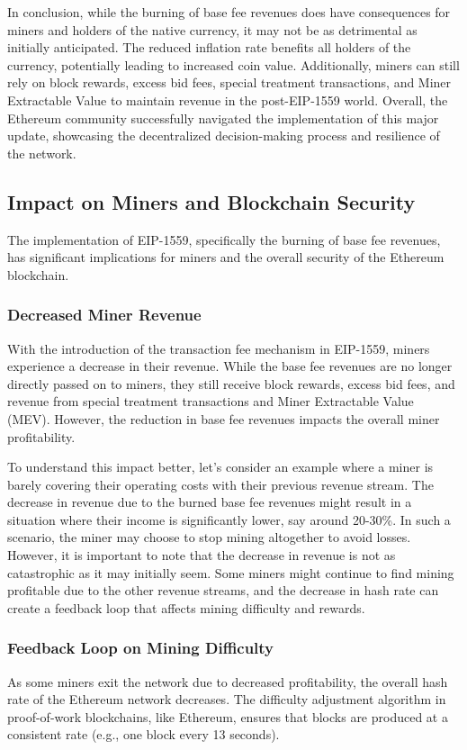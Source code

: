 In conclusion, while the burning of base fee revenues does have consequences for miners and holders of the native currency, it may not be as detrimental as initially anticipated. The reduced inflation rate benefits all holders of the currency, potentially leading to increased coin value. Additionally, miners can still rely on block rewards, excess bid fees, special treatment transactions, and Miner Extractable Value to maintain revenue in the post-EIP-1559 world. Overall, the Ethereum community successfully navigated the implementation of this major update, showcasing the decentralized decision-making process and resilience of the network.

\subsection{Impact on Miners and Blockchain Security}
The implementation of EIP-1559, specifically the burning of base fee revenues, has significant implications for miners and the overall security of the Ethereum blockchain.

\subsubsection{Decreased Miner Revenue}
With the introduction of the transaction fee mechanism in EIP-1559, miners experience a decrease in their revenue. While the base fee revenues are no longer directly passed on to miners, they still receive block rewards, excess bid fees, and revenue from special treatment transactions and Miner Extractable Value (MEV). However, the reduction in base fee revenues impacts the overall miner profitability.

To understand this impact better, let's consider an example where a miner is barely covering their operating costs with their previous revenue stream. The decrease in revenue due to the burned base fee revenues might result in a situation where their income is significantly lower, say around 20-30\%. In such a scenario, the miner may choose to stop mining altogether to avoid losses. However, it is important to note that the decrease in revenue is not as catastrophic as it may initially seem. Some miners might continue to find mining profitable due to the other revenue streams, and the decrease in hash rate can create a feedback loop that affects mining difficulty and rewards.

\subsubsection{Feedback Loop on Mining Difficulty}
As some miners exit the network due to decreased profitability, the overall hash rate of the Ethereum network decreases. The difficulty adjustment algorithm in proof-of-work blockchains, like Ethereum, ensures that blocks are produced at a consistent rate (e.g., one block every 13 seconds).\\

